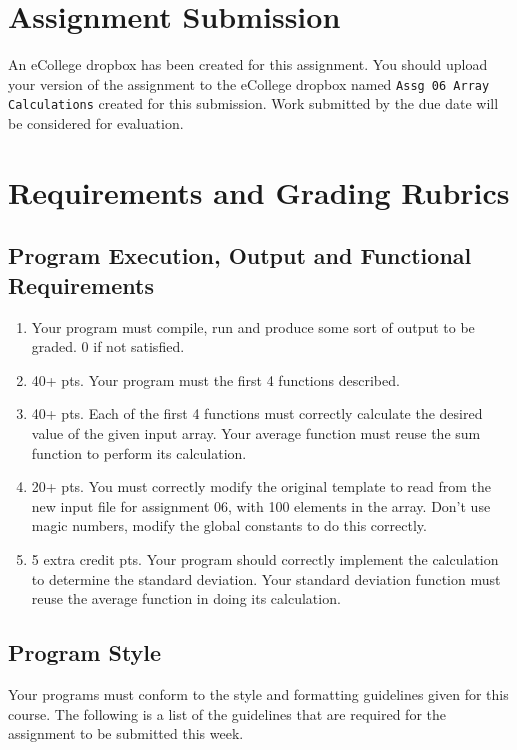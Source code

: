 \documentclass[11pt]{article}
\begin{document}
\section*{Assignment Submission}
\label{sec-4}


An eCollege dropbox has been created for this assignment.  You should
upload your version of the assignment to the eCollege dropbox named
\verb~Assg 06 Array Calculations~ created for this submission.  Work
submitted by the due date will be considered for evaluation.
\section*{Requirements and Grading Rubrics}
\label{sec-5}
\subsection*{Program Execution, Output and Functional Requirements}
\label{sec-5-1}


\begin{enumerate}
\item Your program must compile, run and produce some sort of output to be
  graded. 0 if not satisfied.
\item 40+ pts.  Your program must the first 4 functions described.
\item 40+ pts. Each of the first 4 functions must correctly calculate the desired
   value of the given input array.  Your average function must reuse the sum
   function to perform its calculation.
\item 20+ pts. You must correctly modify the original template to read from the new
   input file for assignment 06, with 100 elements in the array.  Don't use
   magic numbers, modify the global constants to do this correctly.
\item 5 extra credit pts. Your program should correctly implement the calculation to
   determine the standard deviation.  Your standard deviation function must reuse
   the average function in doing its calculation.
\end{enumerate}
\subsection*{Program Style}
\label{sec-5-2}


Your programs must conform to the style and formatting guidelines
given for this course.  The following is a list of the guidelines that
are required for the assignment to be submitted this week.
\end{document}
